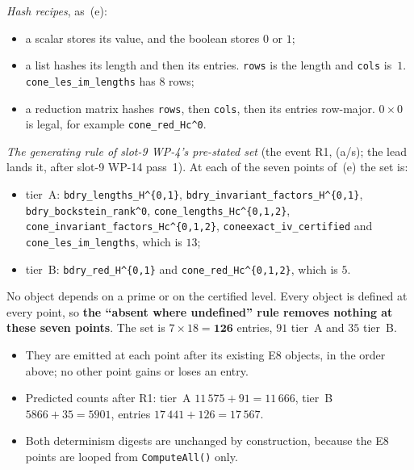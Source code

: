 \documentclass[11pt]{article}
\theoremstyle{remark}
\begin{document}
\emph{Hash recipes}, as~(e):
\begin{itemize}
\item a scalar stores its value, and the boolean stores $0$ or $1$;
\item a list hashes its length and then its entries. \texttt{rows} is the length and
  \texttt{cols} is~$1$. \texttt{cone\_les\_im\_lengths} has $8$ rows;
\item a reduction matrix hashes \texttt{rows}, then \texttt{cols}, then its entries row-major.
  $0\times0$ is legal, for example \texttt{cone\_red\_Hc\textasciicircum0}.
\end{itemize}
\emph{The generating rule of slot-9 WP-4's pre-stated set} (the event R1, (a/s); the lead lands it,
after slot-9 WP-14 pass~1). At each of the seven points of~(e) the set is:
\begin{itemize}
\item tier~A: \texttt{bdry\_lengths\_H\textasciicircum\{0,1\}},
  \texttt{bdry\_invariant\_factors\_H\textasciicircum\{0,1\}},
  \texttt{bdry\_bockstein\_rank\textasciicircum0}, \texttt{cone\_lengths\_Hc\textasciicircum\{0,1,2\}},
  \texttt{cone\_invariant\_factors\_Hc\textasciicircum\{0,1,2\}}, \texttt{coneexact\_iv\_certified}
  and \texttt{cone\_les\_im\_lengths}, which is $13$;
\item tier~B: \texttt{bdry\_red\_H\textasciicircum\{0,1\}} and
  \texttt{cone\_red\_Hc\textasciicircum\{0,1,2\}}, which is $5$.
\end{itemize}
No object depends on a prime or on the certified level. Every object is defined at every point, so
\textbf{the ``absent where undefined'' rule removes nothing at these seven points}. The set is
$7\times18=\mathbf{126}$ entries, $91$ tier~A and $35$ tier~B.
\begin{itemize}
\item They are emitted at each point after its existing E8 objects, in the order above; no other
  point gains or loses an entry.
\item Predicted counts after R1: tier~A $11\,575+91=11\,666$, tier~B $5866+35=5901$, entries
  $17\,441+126=17\,567$.
\item Both determinism digests are unchanged by construction, because the E8 points are looped from
  \texttt{ComputeAll()} only.
\end{itemize}
\end{document}
